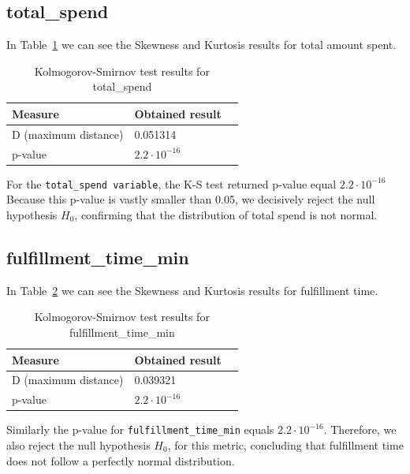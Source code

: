 \documentclass[12pt]{report}
\begin{document}
\subsection{total\_spend}
In Table~\ref{tab:ks_total_spend_no_outliers} we can see the Skewness and Kurtosis results for total amount spent.
\begin{table}[H]

    \centering
    \begin{tabular}{|l|l|l|}
        \hline
        Measure              & Obtained result    \\ \hline
        D (maximum distance) & 0.051314           \\ \hline
        p-value              & \(2.2\cdot10^{-16}\) \\ \hline
    \end{tabular}

    \caption{Kolmogorov-Smirnov test results for total\_spend}\label{tab:ks_total_spend_no_outliers}
\end{table}
For the \texttt{total\_spend variable}, the K-S test returned p-value equal \(2.2\cdot10^{-16}\)
Because this p-value is vastly smaller than 0.05, we decisively reject the null hypothesis \(H_0\), confirming that the distribution of total spend is not normal.
\subsection{fulfillment\_time\_min}
In Table~\ref{tab:ks_fulfillment_time} we can see the Skewness and Kurtosis results for fulfillment time.
\begin{table}[H]

    \centering
    \begin{tabular}{|l|l|l|}
        \hline
        Measure              & Obtained result    \\ \hline
        D (maximum distance) & 0.039321           \\ \hline
        p-value              & \(2.2\cdot10^{-16}\) \\ \hline
    \end{tabular}

    \caption{Kolmogorov-Smirnov test results for fulfillment\_time\_min}
    \label{tab:ks_fulfillment_time}
\end{table}
Similarly the p-value for  \texttt{fulfillment\_time\_min} equals \(2.2\cdot10^{-16}\).
Therefore, we also reject the null hypothesis \(H_0\), for this metric, concluding that fulfillment time does not follow a perfectly normal distribution.
\end{document}
